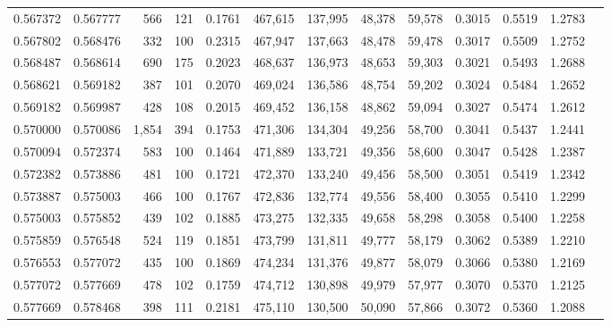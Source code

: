 \begin{tabular}{rrrrrrrrrrrrr}
0.567372 & 0.567777 &   566 & 121 &                                     0.1761 & 467,615 & 137,995 &  48,378 &  59,578 & 0.3015 & 0.5519 & 1.2783 \\
0.567802 & 0.568476 &   332 & 100 &                                     0.2315 & 467,947 & 137,663 &  48,478 &  59,478 & 0.3017 & 0.5509 & 1.2752 \\
0.568487 & 0.568614 &   690 & 175 &                                     0.2023 & 468,637 & 136,973 &  48,653 &  59,303 & 0.3021 & 0.5493 & 1.2688 \\
0.568621 & 0.569182 &   387 & 101 &                                     0.2070 & 469,024 & 136,586 &  48,754 &  59,202 & 0.3024 & 0.5484 & 1.2652 \\
0.569182 & 0.569987 &   428 & 108 &                                     0.2015 & 469,452 & 136,158 &  48,862 &  59,094 & 0.3027 & 0.5474 & 1.2612 \\
0.570000 & 0.570086 & 1,854 & 394 &                                     0.1753 & 471,306 & 134,304 &  49,256 &  58,700 & 0.3041 & 0.5437 & 1.2441 \\
0.570094 & 0.572374 &   583 & 100 &                                     0.1464 & 471,889 & 133,721 &  49,356 &  58,600 & 0.3047 & 0.5428 & 1.2387 \\
0.572382 & 0.573886 &   481 & 100 &                                     0.1721 & 472,370 & 133,240 &  49,456 &  58,500 & 0.3051 & 0.5419 & 1.2342 \\
0.573887 & 0.575003 &   466 & 100 &                                     0.1767 & 472,836 & 132,774 &  49,556 &  58,400 & 0.3055 & 0.5410 & 1.2299 \\
0.575003 & 0.575852 &   439 & 102 &                                     0.1885 & 473,275 & 132,335 &  49,658 &  58,298 & 0.3058 & 0.5400 & 1.2258 \\
0.575859 & 0.576548 &   524 & 119 &                                     0.1851 & 473,799 & 131,811 &  49,777 &  58,179 & 0.3062 & 0.5389 & 1.2210 \\
0.576553 & 0.577072 &   435 & 100 &                                     0.1869 & 474,234 & 131,376 &  49,877 &  58,079 & 0.3066 & 0.5380 & 1.2169 \\
0.577072 & 0.577669 &   478 & 102 &                                     0.1759 & 474,712 & 130,898 &  49,979 &  57,977 & 0.3070 & 0.5370 & 1.2125 \\
0.577669 & 0.578468 &   398 & 111 &                                     0.2181 & 475,110 & 130,500 &  50,090 &  57,866 & 0.3072 & 0.5360 & 1.2088 \\

\end{tabular}
